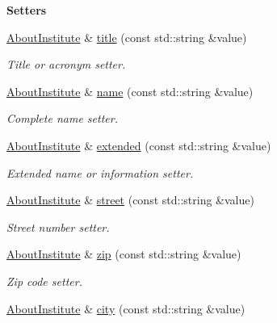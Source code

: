 \begin{Indent}{\bf Setters}\par
\begin{DoxyCompactItemize}
\item 
\hyperlink{exceptionmagrathea_1_1AboutInstitute}{About\-Institute} \& \hyperlink{exceptionmagrathea_1_1AboutInstitute_a5bdaa28ccbd745c53a81862343f0e5ea}{title} (const std\-::string \&value)
\begin{DoxyCompactList}\small\item\em Title or acronym setter. \end{DoxyCompactList}\item 
\hyperlink{exceptionmagrathea_1_1AboutInstitute}{About\-Institute} \& \hyperlink{exceptionmagrathea_1_1AboutInstitute_af661664537ba30b7a4c52d5d53246d37}{name} (const std\-::string \&value)
\begin{DoxyCompactList}\small\item\em Complete name setter. \end{DoxyCompactList}\item 
\hyperlink{exceptionmagrathea_1_1AboutInstitute}{About\-Institute} \& \hyperlink{exceptionmagrathea_1_1AboutInstitute_a70a9ccfaea59b45dfd451dc24f9adc73}{extended} (const std\-::string \&value)
\begin{DoxyCompactList}\small\item\em Extended name or information setter. \end{DoxyCompactList}\item 
\hyperlink{exceptionmagrathea_1_1AboutInstitute}{About\-Institute} \& \hyperlink{exceptionmagrathea_1_1AboutInstitute_a47bdc043ba6aae7f5b6e72e94b0600da}{street} (const std\-::string \&value)
\begin{DoxyCompactList}\small\item\em Street number setter. \end{DoxyCompactList}\item 
\hyperlink{exceptionmagrathea_1_1AboutInstitute}{About\-Institute} \& \hyperlink{exceptionmagrathea_1_1AboutInstitute_a03cebc8f917499334ee655cbfd5f6195}{zip} (const std\-::string \&value)
\begin{DoxyCompactList}\small\item\em Zip code setter. \end{DoxyCompactList}\item 
\hyperlink{exceptionmagrathea_1_1AboutInstitute}{About\-Institute} \& \hyperlink{exceptionmagrathea_1_1AboutInstitute_a6a35095d607673e287b07ebafebf048b}{city} (const std\-::string \&value)

\end{DoxyCompactItemize}
\end{Indent}
